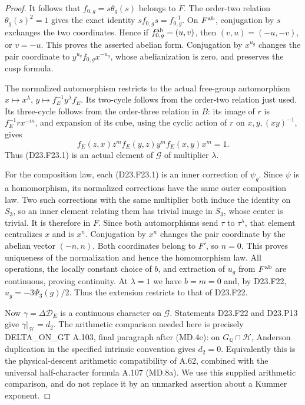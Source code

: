 \begin{proof}
It follows that $f_{0,g}=s\theta_g(s)$ belongs to $F$.
The order-two relation $\theta_g(s)^2=1$ gives the exact identity
$s f_{0,g}s=f_{0,g}^{-1}$. On $F^{\rm ab}$, conjugation by $s$
exchanges the two coordinates. Hence if
$f_{0,g}^{\rm ab}=(u,v)$, then $(v,u)=(-u,-v)$, or $v=-u$.
This proves the asserted abelian form. Conjugation by $x^{u_g}$
changes the pair coordinate to $y^{u_g}f_{0,g}x^{-u_g}$, whose
abelianization is zero, and preserves the cusp formula.

The normalized automorphism restricts to the actual free-group
automorphism
$x\mapsto x^\lambda$, $y\mapsto f_E^{-1}y^\lambda f_E$.
Its two-cycle follows from the order-two relation just used.
Its three-cycle follows from the order-three relation in $B$:
its image of $r$ is $f_E^{-1}r x^{-m}$, and expansion of its
cube, using the cyclic action of $r$ on $x,y,(xy)^{-1}$, gives
\[
 f_E(z,x)z^m f_E(y,z)y^m f_E(x,y)x^m=1.
\]
Thus (D23.F23.1) is an actual element of $\mathcal G$ of
multiplier $\lambda$.

For the composition law, each (D23.F23.1) is an inner correction
of $\psi_g$. Since $\psi$ is a homomorphism, its normalized
corrections have the same outer composition law. Two such
corrections with the same multiplier both induce the identity
on $S_3$, so an inner element relating them has trivial image
in $S_3$, whose center is trivial. It is therefore in $F$.
Since both automorphisms send $\tau$ to $\tau^\lambda$, that
element centralizes $x$ and is $x^n$. Conjugation by $x^n$
changes the pair coordinate by the abelian vector $(-n,n)$.
Both coordinates belong to $F'$, so $n=0$. This proves uniqueness
of the normalization and hence the homomorphism law.
All operations, the locally constant choice of $b$, and extraction
of $u_g$ from $F^{\rm ab}$ are continuous, proving continuity.
At $\lambda=1$ we have $b=m=0$ and, by \textup{D23.F22},
$u_g=-3\Psi_3(g)/2$. Thus the extension restricts to that of
\textup{D23.F22}.

Now $\gamma=\Delta\mathcal D_E$ is a continuous character on
$\mathcal G$. Statements \textup{D23.F22} and \textup{D23.P13}
give $\gamma|_{\mathcal H}=d_2$.
The arithmetic comparison needed here is precisely
\textup{DELTA\_ON\_GT A.103}, final paragraph after
\textup{(MD.4e)}: on $G_{\mathbb Q}\cap\mathcal H$,
Anderson duplication in the specified intrinsic convention gives
$d_2=0$. Equivalently this is the physical-descent arithmetic
compatibility of \textup{A.62}, combined with the universal
half-character formula \textup{A.107 (MD.8a)}.
We use this supplied arithmetic comparison, and do not replace
it by an unmarked assertion about a Kummer exponent.


\end{proof}
